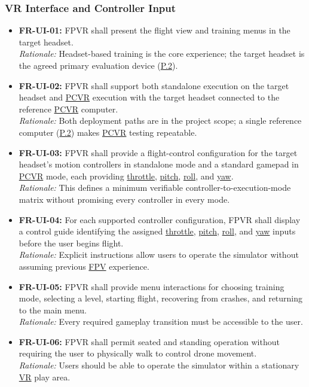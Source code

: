\documentclass[12pt]{article}
\begin{document}
\subsubsection{VR Interface and Controller Input}
\label{sec:s2-interface}
\begin{itemize}
\item \hypertarget{req:FR-UI-01}{}\textbf{FR-UI-01:} FPVR shall present the flight view and training menus in the target headset.\\
\textit{Rationale:} Headset-based training is the core experience; the target headset is the agreed primary evaluation device (\hyperref[p2]{P.2}).
\item \hypertarget{req:FR-UI-02}{}\textbf{FR-UI-02:} FPVR shall support both standalone execution on the target headset and \hyperlink{glos:PCVR}{PCVR} execution with the target headset connected to the reference \hyperlink{glos:PCVR}{PCVR} computer.\\
\textit{Rationale:} Both deployment paths are in the project scope; a single reference computer (\hyperref[p2]{P.2}) makes \hyperlink{glos:PCVR}{PCVR} testing repeatable.
\item \hypertarget{req:FR-UI-03}{}\textbf{FR-UI-03:} FPVR shall provide a flight-control configuration for the target headset's motion controllers in standalone mode and a standard gamepad in \hyperlink{glos:PCVR}{PCVR} mode, each providing \hyperlink{glos:Throttle}{throttle}, \hyperlink{glos:Throttle}{pitch}, \hyperlink{glos:Throttle}{roll}, and \hyperlink{glos:Throttle}{yaw}.\\
\textit{Rationale:} This defines a minimum verifiable controller-to-execution-mode matrix without promising every controller in every mode.
\item \hypertarget{req:FR-UI-04}{}\textbf{FR-UI-04:} For each supported controller configuration, FPVR shall display a control guide identifying the assigned \hyperlink{glos:Throttle}{throttle}, \hyperlink{glos:Throttle}{pitch}, \hyperlink{glos:Throttle}{roll}, and \hyperlink{glos:Throttle}{yaw} inputs before the user begins flight.\\
\textit{Rationale:} Explicit instructions allow users to operate the simulator without assuming previous \hyperlink{glos:FPV}{FPV} experience.
\item \hypertarget{req:FR-UI-05}{}\textbf{FR-UI-05:} FPVR shall provide menu interactions for choosing training mode, selecting a level, starting flight, recovering from crashes, and returning to the main menu.\\
\textit{Rationale:} Every required gameplay transition must be accessible to the user.
\item \hypertarget{req:FR-UI-06}{}\textbf{FR-UI-06:} FPVR shall permit seated and standing operation without requiring the user to physically walk to control drone movement.\\
\textit{Rationale:} Users should be able to operate the simulator within a stationary \hyperlink{glos:VR}{VR} play area.
\end{itemize}
\end{document}
